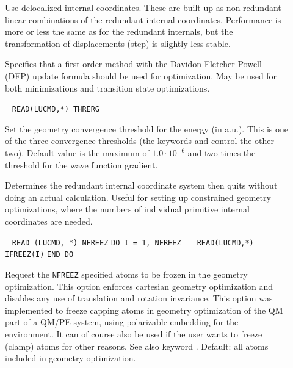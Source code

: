 \begin{description}
\item[]
Use delocalized internal coordinates.
These are built up as
non-redundant linear combinations of the redundant internal
coordinates. Performance is more or less the same as for the redundant
internals, but the transformation of displacements (step) is slightly
less stable.

\item[]
Specifies that a first-order method with the
Davidon-Fletcher-Powell (DFP) update
formula should be used for optimization. May be used for both
minimizations and transition state optimizations.

\item[]\verb| | \newline
\verb|READ(LUCMD,*) THRERG|

Set the geometry convergence threshold for the energy (in a.u.). This is one of the three
convergence thresholds (the keywords
 and 
control the other two). Default value is the maximum of $1.0\cdot
10^{-6}$ and two times the threshold for the wave function gradient.

\item[]
Determines the redundant internal coordinate system then quits without
doing an actual calculation. Useful for setting up constrained
geometry optimizations, where the numbers of individual primitive
internal coordinates are needed.

\item[] \verb| |\newline
\verb|READ (LUCMD, *) NFREEZ|\newline
\verb|DO I = 1, NFREEZ|\newline
\verb|   READ(LUCMD,*) IFREEZ(I)|\newline
\verb|END DO|

Request the \verb|NFREEZ| specified atoms to be frozen in the geometry optimization.
This option enforces cartesian geometry optimization
and disables any use of translation and rotation invariance.
This option was implemented to freeze capping atoms in geometry optimization of
the QM part of a QM/PE system, using polarizable embedding for the environment.
It can of course also be used if the user wants to freeze (clamp) atoms for other reasons.
See also keyword . Default: all atoms included in geometry optimization.


\end{description}
